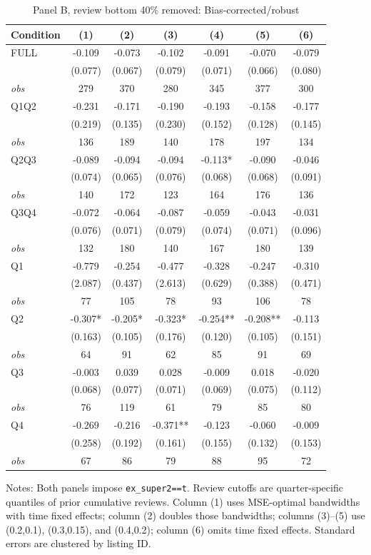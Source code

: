 \begin{table}[!htbp]
\centering
\caption{Panel B, review bottom 40\% removed: Bias-corrected/robust}
\begin{tabular}{lcccccc}
\toprule
Condition & (1) & (2) & (3) & (4) & (5) & (6) \\
\midrule
FULL & -0.109 & -0.073 & -0.102 & -0.091 & -0.070 & -0.079 \\
 & (0.077) & (0.067) & (0.079) & (0.071) & (0.066) & (0.080) \\
\textit{obs} & 279 & 370 & 280 & 345 & 377 & 300 \\
Q1Q2 & -0.231 & -0.171 & -0.190 & -0.193 & -0.158 & -0.177 \\
 & (0.219) & (0.135) & (0.230) & (0.152) & (0.128) & (0.145) \\
\textit{obs} & 136 & 189 & 140 & 178 & 197 & 134 \\
Q2Q3 & -0.089 & -0.094 & -0.094 & -0.113* & -0.090 & -0.046 \\
 & (0.074) & (0.065) & (0.076) & (0.068) & (0.068) & (0.091) \\
\textit{obs} & 140 & 172 & 123 & 164 & 176 & 136 \\
Q3Q4 & -0.072 & -0.064 & -0.087 & -0.059 & -0.043 & -0.031 \\
 & (0.076) & (0.071) & (0.079) & (0.074) & (0.071) & (0.096) \\
\textit{obs} & 132 & 180 & 140 & 167 & 180 & 139 \\
Q1 & -0.779 & -0.254 & -0.477 & -0.328 & -0.247 & -0.310 \\
 & (2.087) & (0.437) & (2.613) & (0.629) & (0.388) & (0.471) \\
\textit{obs} & 77 & 105 & 78 & 93 & 106 & 78 \\
Q2 & -0.307* & -0.205* & -0.323* & -0.254** & -0.208** & -0.113 \\
 & (0.163) & (0.105) & (0.176) & (0.120) & (0.105) & (0.151) \\
\textit{obs} & 64 & 91 & 62 & 85 & 91 & 69 \\
Q3 & -0.003 & 0.039 & 0.028 & -0.009 & 0.018 & -0.020 \\
 & (0.068) & (0.077) & (0.071) & (0.069) & (0.075) & (0.112) \\
\textit{obs} & 76 & 119 & 61 & 79 & 85 & 80 \\
Q4 & -0.269 & -0.216 & -0.371** & -0.123 & -0.060 & -0.009 \\
 & (0.258) & (0.192) & (0.161) & (0.155) & (0.132) & (0.153) \\
\textit{obs} & 67 & 86 & 79 & 88 & 95 & 72 \\
\bottomrule
\end{tabular}
\begin{minipage}{0.98\textwidth}\footnotesize
Notes: Both panels impose \texttt{ex\_super2==t}. Review cutoffs are quarter-specific quantiles of prior cumulative reviews. Column (1) uses MSE-optimal bandwidths with time fixed effects; column (2) doubles those bandwidths; columns (3)--(5) use (0.2,0.1), (0.3,0.15), and (0.4,0.2); column (6) omits time fixed effects. Standard errors are clustered by listing ID.
\end{minipage}
\end{table}

